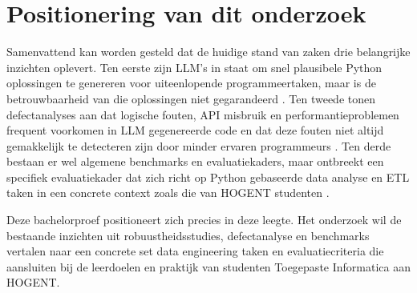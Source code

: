\section{Positionering van dit onderzoek}

Samenvattend kan worden gesteld dat de huidige stand van zaken drie belangrijke inzichten oplevert. Ten eerste zijn LLM's in staat om snel plausibele Python oplossingen te genereren voor uiteenlopende programmeertaken, maar is de betrouwbaarheid van die oplossingen niet gegarandeerd \autocite{Li2023}. Ten tweede tonen defectanalyses aan dat logische fouten, API misbruik en performantieproblemen frequent voorkomen in LLM gegenereerde code en dat deze fouten niet altijd gemakkelijk te detecteren zijn door minder ervaren programmeurs \autocite{Esfahani2024}. Ten derde bestaan er wel algemene benchmarks en evaluatiekaders, maar ontbreekt een specifiek evaluatiekader dat zich richt op Python gebaseerde data analyse en ETL taken in een concrete context zoals die van HOGENT studenten \autocite{Ni2024,Nascimento2024}.

Deze bachelorproef positioneert zich precies in deze leegte. Het onderzoek wil de bestaande inzichten uit robuustheidsstudies, defectanalyse en benchmarks vertalen naar een concrete set data engineering taken en evaluatiecriteria die aansluiten bij de leerdoelen en praktijk van studenten Toegepaste Informatica aan HOGENT.

